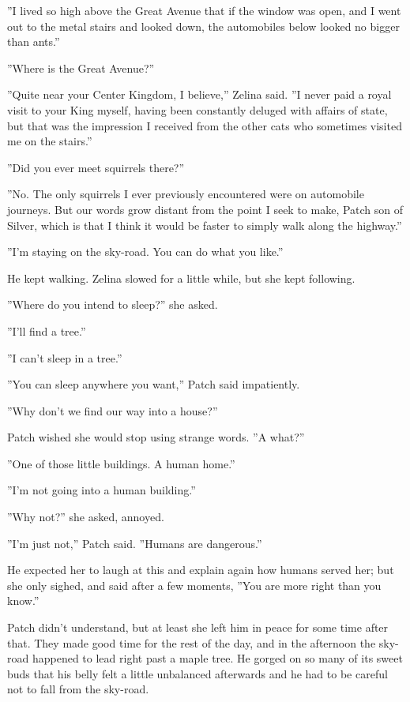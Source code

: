 \documentclass[12pt]{book}
\begin{document}
''I lived so high above the Great Avenue that if the window was open,
and I went out to the metal stairs and looked down, the automobiles
below looked no bigger than ants.''

''Where is the Great Avenue?''

''Quite near your Center Kingdom, I believe,'' Zelina said. ''I never
paid a royal visit to your King myself, having been constantly deluged
with affairs of state, but that was the impression I received from the
other cats who sometimes visited me on the stairs.''

''Did you ever meet squirrels there?''

''No. The only squirrels I ever previously encountered were on
automobile journeys. But our words grow distant from the point I seek
to make, Patch son of Silver, which is that I think it would be faster
to simply walk along the highway.''

''I'm staying on the sky-road. You can do what you like.''

He kept walking. Zelina slowed for a little while, but she kept
following.

''Where do you intend to sleep?'' she asked.

''I'll find a tree.''

''I can't sleep in a tree.''

''You can sleep anywhere you want,'' Patch said impatiently.

''Why don't we find our way into a house?''

Patch wished she would stop using strange words. ''A what?''

''One of those little buildings. A human home.''

''I'm not going into a human building.''

''Why not?'' she asked, annoyed.

''I'm just not,'' Patch said. ''Humans are dangerous.''

He expected her to laugh at this and explain again how humans served
her; but she only sighed, and said after a few moments, ''You are more
right than you know.''

Patch didn't understand, but at least she left him in peace for some
time after that. They made good time for the rest of the day, and in
the afternoon the sky-road happened to lead right past a maple
tree. He gorged on so many of its sweet buds that his belly felt a
little unbalanced afterwards and he had to be careful not to fall from
the sky-road.
\end{document}
